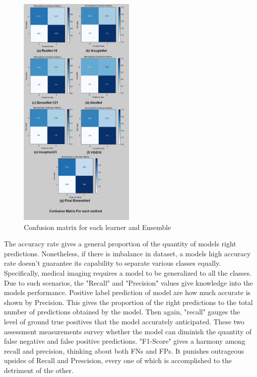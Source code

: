 \documentclass{ieeeaccess}
\begin{document}
\begin{figure}[h]
\includegraphics[width=0.5\textwidth, inner]{cm.png}
\caption{Confusion matrix for each learner and Ensemble}
\label{fig:cm}
\end{figure}
The accuracy rate gives a general proportion of the quantity of models right predictions. Nonetheless, if there is imbalance in dataset, a models high accuracy rate doesn't guarantee its capability to separate various classes equally. Specifically, medical imaging requires a model to be generalized to all the classes. Due to such scenarios, the "Recall" and "Precision" values give knowledge into the models performance. Positive label prediction of model are how much accurate is shown by Precision. This gives the proportion of the right predictions to the total number of predictions obtained by the model. Then again, "recall" gauges the level of ground true positives that the model accurately anticipated. These two assessment measurements survey whether the model can diminish the quantity of false negative and false positive predictions. "F1-Score" gives a harmony among recall and precision, thinking about both FNs and FPs. It punishes outrageous upsides of Recall and Prescision, every one of which is accomplished to the detriment of the other.
\end{document}
